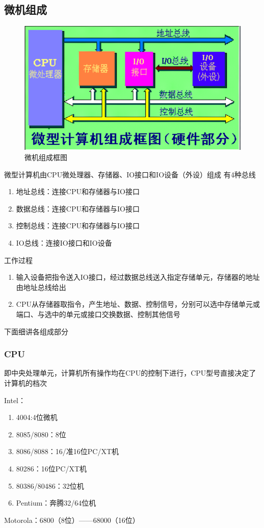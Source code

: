 \subsection{微机组成}
\begin{figure}[H]
    \centering
    \includegraphics[scale=1]{part_8086CPU/part_8086CPU_pic/微机组成框图.png}
    \caption{微机组成框图}
\end{figure}
微型计算机由CPU微处理器、存储器、IO接口和IO设备（外设）组成
有4种总线
\begin{enumerate}
    \item 地址总线：连接CPU和存储器与IO接口
    \item 数据总线：连接CPU和存储器与IO接口
    \item 控制总线：连接CPU和存储器与IO接口
    \item IO总线：连接IO接口和IO设备
\end{enumerate}
工作过程
\begin{enumerate}
    \item 输入设备把指令送入IO接口，经过数据总线送入指定存储单元，存储器的地址由地址总线给出
    \item CPU从存储器取指令，产生地址、数据、控制信号，分别可以选中存储单元或端口、与选中的单元或接口交换数据、控制其他信号
\end{enumerate}
下面细讲各组成部分
\subsubsection{CPU}
即中央处理单元，计算机所有操作均在CPU的控制下进行，CPU型号直接决定了计算机的档次

Intel：
\begin{enumerate}
    \item 4004:4位微机
    \item 8085/8080：8位
    \item 8086/8088：16/准16位PC/XT机
    \item 80286：16位PC/XT机
    \item 80386/80486：32位机
    \item Pentium：奔腾32/64位机
\end{enumerate}
Motorola：6800（8位）——68000（16位）

